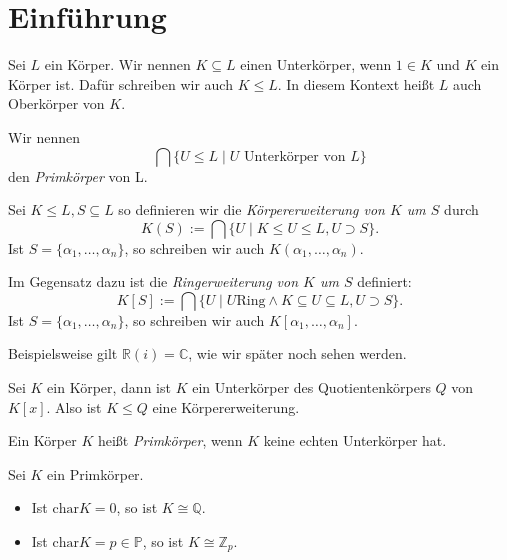 \section{Einführung}

\begin{definition}
    Sei $L$ ein Körper. Wir nennen $K \subseteq L$ einen Unterkörper, wenn $1 \in K$ und $K$ ein Körper ist. Dafür schreiben wir auch $K \leq L$. In diesem Kontext heißt $L$ auch Oberkörper von $K$.

    Wir nennen
    $$ \bigcap \{ U \leq L \mid U \text{ Unterkörper von } L \} $$
    den \emph{Primkörper} von L.

    Sei $K \leq L, S \subseteq L$ so definieren wir die \emph{Körpererweiterung von $K$ um $S$} durch
    $$ K(S) := \bigcap \{ U \mid K \leq U \leq L, U \supset S \}. $$
    Ist $S = \{ \alpha_1, \hdots, \alpha_n \}$, so schreiben wir auch $K(\alpha_1, \hdots, \alpha_n)$.
    
    Im Gegensatz dazu ist die \emph{Ringerweiterung von $K$ um $S$} definiert:
    $$ K[S] := \bigcap \{ U \mid U \mathrm{ Ring }\land K \subseteq U \subseteq L, U \supset S \}. $$
    Ist $S = \{ \alpha_1, \hdots, \alpha_n \}$, so schreiben wir auch $K[\alpha_1, \hdots, \alpha_n]$.
\end{definition}

\begin{remark}
    Beispielsweise gilt $\mathbb{R}(i) = \mathbb{C}$, wie wir später noch sehen werden.
\end{remark}

\begin{remark}
    Sei $K$ ein Körper, dann ist $K$ ein Unterkörper des Quotientenkörpers $Q$ von $K[x]$. Also ist $K \leq Q$ eine Körpererweiterung.
\end{remark}

\begin{definition}
    Ein Körper $K$ heißt \emph{Primkörper}, wenn $K$ keine echten Unterkörper hat.
\end{definition}

\begin{theorem}
    Sei $K$ ein Primkörper.
    \begin{itemize}
        \item Ist $\mathrm{char} K = 0$, so ist $K \cong \mathbb{Q}$.
        \item Ist $\mathrm{char} K = p \in \mathbb{P}$, so ist $K \cong \mathbb{Z}_p$.
    \end{itemize}
\end{theorem}


